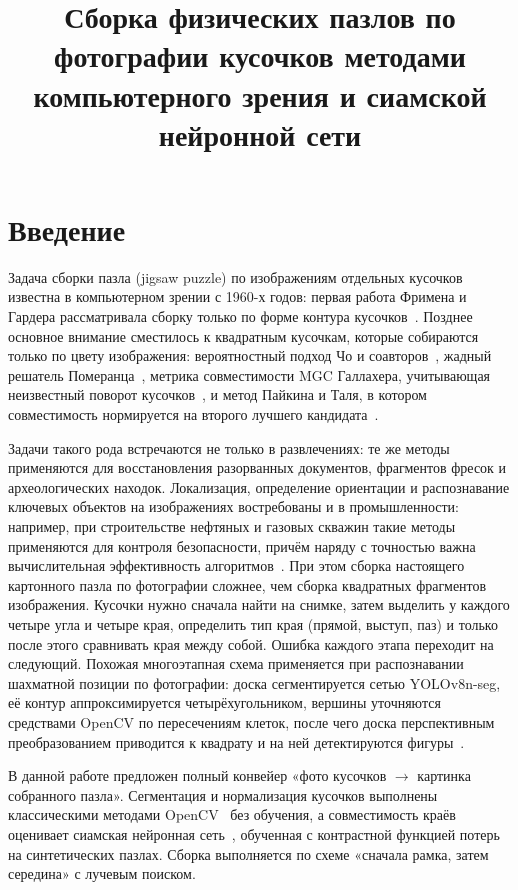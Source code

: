 \documentclass{misisarticle}
\title{Сборка физических пазлов по фотографии кусочков методами компьютерного зрения и сиамской нейронной сети}
\begin{document}
\maketitle

\section{Введение}

Задача сборки пазла (jigsaw puzzle) по изображениям отдельных кусочков известна в компьютерном зрении с 1960-х годов: первая работа Фримена и Гардера рассматривала сборку только по форме контура кусочков~\cite{freeman1964}. Позднее основное внимание сместилось к квадратным кусочкам, которые собираются только по цвету изображения: вероятностный подход Чо и соавторов~\cite{cho2010}, жадный решатель Померанца~\cite{pomeranz2011}, метрика совместимости MGC Галлахера, учитывающая неизвестный поворот кусочков~\cite{gallagher2012}, и метод Пайкина и Таля, в котором совместимость нормируется на второго лучшего кандидата~\cite{paikin2015}.

Задачи такого рода встречаются не только в развлечениях: те же методы применяются для восстановления разорванных документов, фрагментов фресок и археологических находок. Локализация, определение ориентации и распознавание ключевых объектов на изображениях востребованы и в промышленности: например, при строительстве нефтяных и газовых скважин такие методы применяются для контроля безопасности, причём наряду с точностью важна вычислительная эффективность алгоритмов~\cite{usilin2020}. При этом сборка настоящего картонного пазла по фотографии сложнее, чем сборка квадратных фрагментов изображения. Кусочки нужно сначала найти на снимке, затем выделить у каждого четыре угла и четыре края, определить тип края (прямой, выступ, паз) и только после этого сравнивать края между собой. Ошибка каждого этапа переходит на следующий. Похожая многоэтапная схема применяется при распознавании шахматной позиции по фотографии: доска сегментируется сетью YOLOv8n-seg, её контур аппроксимируется четырёхугольником, вершины уточняются средствами OpenCV по пересечениям клеток, после чего доска перспективным преобразованием приводится к квадрату и на ней детектируются фигуры~\cite{chikin2026}.

В данной работе предложен полный конвейер «фото кусочков $\to$ картинка собранного пазла». Сегментация и нормализация кусочков выполнены классическими методами OpenCV~\cite{opencv} без обучения, а совместимость краёв оценивает сиамская нейронная сеть~\cite{bromley1994}, обученная с контрастной функцией потерь~\cite{oord2018} на синтетических пазлах. Сборка выполняется по схеме «сначала рамка, затем середина» с лучевым поиском.
\end{document}
